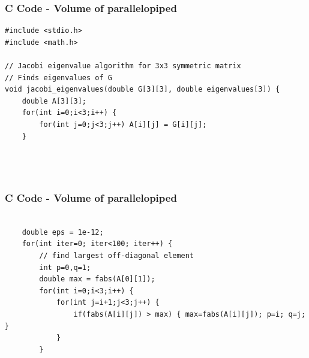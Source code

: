 \documentclass{beamer}
\begin{document}
\begin{frame}[fragile]
    \frametitle{C Code - Volume of parallelopiped}

    \begin{lstlisting}
#include <stdio.h>
#include <math.h>

// Jacobi eigenvalue algorithm for 3x3 symmetric matrix
// Finds eigenvalues of G
void jacobi_eigenvalues(double G[3][3], double eigenvalues[3]) {
    double A[3][3];
    for(int i=0;i<3;i++) {
        for(int j=0;j<3;j++) A[i][j] = G[i][j];
    }


        
    \end{lstlisting}
\end{frame}

\begin{frame}[fragile]
    \frametitle{C Code - Volume of parallelopiped}

    \begin{lstlisting}

    double eps = 1e-12;
    for(int iter=0; iter<100; iter++) {
        // find largest off-diagonal element
        int p=0,q=1;
        double max = fabs(A[0][1]);
        for(int i=0;i<3;i++) {
            for(int j=i+1;j<3;j++) {
                if(fabs(A[i][j]) > max) { max=fabs(A[i][j]); p=i; q=j; }
            }
        }
        
    \end{lstlisting}
\end{frame}
\end{document}
